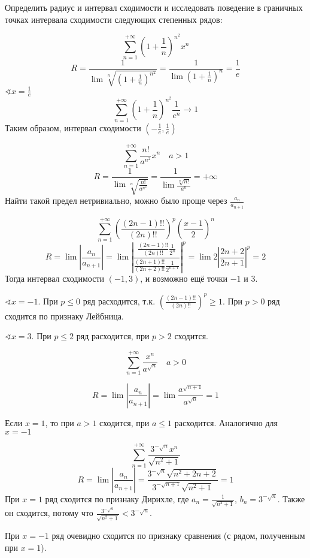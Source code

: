 Определить радиус и интервал сходимости и исследовать поведение в граничных точках интервала сходимости следующих степенных рядов:
\begin{exercise}[2816]
    \[\sum_{n = 1}^{+\infty} \left( 1 + \frac{1}{n} \right)^{n^2} x^n\]
    \[R = \frac{1}{\lim \sqrt[n]{\left( 1 + \frac{1}{n} \right)^{n^2}}} = \frac{1}{\lim \left( 1 + \frac{1}{n} \right)^n} = \frac{1}{e}\]
    \(\sphericalangle x = \frac{1}{e}\)
    \[\sum_{n = 1}^{+\infty} \left( 1 + \frac{1}{n} \right)^{n^2} \frac{1}{e^n} \to 1\]
    Таким образом, интервал сходимости \(( - \frac{1}{e}, \frac{1}{e})\)
\end{exercise}

\begin{exercise}[2817]
    \[\sum_{n = 1}^{+\infty} \frac{n!}{a^{n^2}} x^n \quad a > 1 \]
    \[R = \frac{1}{\lim \sqrt[n]{\frac{n!}{a^{n^2}}}} = \frac{1}{\lim \frac{\sqrt[n]{n!}}{a^n} } = +\infty\]
    Найти такой предел нетривиально, можно было проще через \(\frac{a_n}{a_{n+1}}\)
\end{exercise}

\begin{exercise}[2818]
    \[\sum_{n = 1}^{+\infty} \left(\frac{(2n - 1)!!}{(2n)!!}\right)^p \left( \frac{x - 1}{2} \right)^n \]
    \[R = \lim \left|\frac{a_n}{a_{n+1}}\right| = \lim \left|\frac{\frac{(2n - 1)!!}{(2n)!!}\frac{1}{2^n}}{\frac{(2n + 1)!!}{(2n + 2)!!}\frac{1}{2^{n + 1}}} \right|^p = \lim 2\left|\frac{2n + 2}{2n + 1}\right|^p = 2\]
    Тогда интервал сходимости \(( - 1, 3)\), и возможно ещё точки \( - 1\) и \(3\).

    \(\sphericalangle x = - 1\). При \(p \leq 0\) ряд расходится, т.к. \(\left(\frac{(2n - 1)!!}{(2n)!!}\right)^p \geq 1\). При \(p > 0\) ряд сходится по признаку Лейбница.

    \(\sphericalangle x = 3\). При \(p \leq 2\) ряд расходится, при \(p > 2\) сходится.
\end{exercise}

\begin{exercise}[2823]
    \[\sum_{n = 1}^{+\infty} \frac{x^n}{a^{\sqrt{n}}} \quad a > 0\]

    \[R = \lim \left|\frac{a_n}{a_{n+1}}\right| = \lim \frac{a^{\sqrt{n + 1}}}{a^{\sqrt{n}}} = 1\]

    Если \(x = 1\), то при \(a > 1\) сходится, при \(a \leq 1\) расходится. Аналогично для \(x =- 1\)
\end{exercise}

\begin{exercise}[2824]
    \[\sum_{n = 1}^{+\infty} \frac{3^{ - \sqrt{n}} x^n}{\sqrt{n^2 + 1}} \]
    \[R = \lim \left|\frac{a_n}{a_{n+1}}\right| = \frac{3^{ - \sqrt{n}} \sqrt{n^2 + 2n + 2}}{3^{ - \sqrt{n + 1}} \sqrt{n^2 + 1}} = 1\]
    При \(x = 1\) ряд сходится по признаку Дирихле, где \(a_n = \frac{1}{\sqrt{n^2 + 1}}\), \(b_n = 3^{ - \sqrt{n}}\). Также он сходится, потому что \(\frac{3^{ - \sqrt{n}}}{\sqrt{n^2 + 1}} < 3^{ - \sqrt{n}}\).

    При \(x =- 1\) ряд очевидно сходится по признаку сравнения (с рядом, полученным при \(x = 1\)).
\end{exercise}

